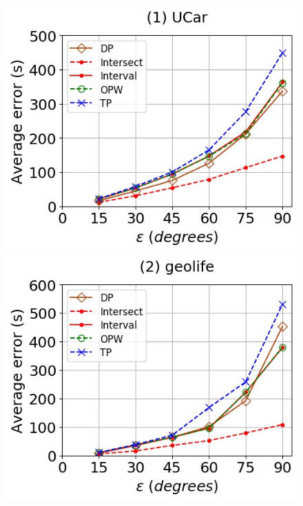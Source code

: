 {\begin{figure}[tb!]
	\centering
	\includegraphics[scale = 0.350]{Figures/Exp-when-DAD-error-epsilon-service.jpg}\hspace{0.5ex}
	\includegraphics[scale = 0.350]{Figures/Exp-when-DAD-error-epsilon-geolife.jpg}\hspace{0.5ex}

\end{figure}}
